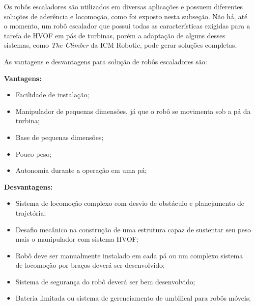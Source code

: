Os robôs escaladores são utilizados em diversas aplicações e possuem diferentes
soluções de aderência e locomoção, como foi exposto nesta subseção. Não há,
até o momento, um robô escalador que possui todas as características
exigidas para a tarefa de HVOF em pás de turbinas, porém a adaptação de
alguns desses sistemas, como \emph{The Climber} da ICM Robotic, pode gerar
soluções completas.

As vantagens e desvantagens para solução de robôs escaladores são:

\textbf{Vantagens:}
\begin{itemize}
  \item Facilidade de instalação;
  \item Manipulador de pequenas dimensões, já que o robô se movimenta sob a pá
  da turbina;
  \item Base de pequenas dimensões;
  \item Pouco peso;
  \item Autonomia durante a operação em uma pá; 
\end{itemize}

\textbf{Desvantagens:}
\begin{itemize}
  \item Sistema de locomoção complexo com desvio de obstáculo e planejamento de
  trajetória;
  \item Desafio mecânico na construção de uma estrutura capaz de sustentar seu
  peso mais o manipulador com sistema HVOF;
  \item Robô deve ser manualmente instalado em cada pá ou um complexo sistema
  de locomoção por braços deverá ser desenvolvido;
  \item Sistema de segurança do robô deverá ser bem desenvolvido;
  \item Bateria limitada ou sistema de gerenciamento de umbilical para robôs
  móveis;
\end{itemize}
